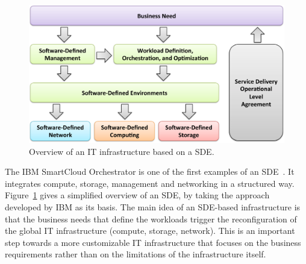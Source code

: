 %
%

\begin{figure}[ht!]
\centering
\includegraphics[width=0.95\columnwidth]{figures/fig10_sde_enabled_IT.pdf}
\caption{Overview of an IT infrastructure based on a SDE.}
\label{fig:SDEenabledIT}
\end{figure}


The IBM SmartCloud Orchestrator is one of the first examples of an SDE~\cite{li2014,racherla2014}.
It integrates compute, storage, management and networking in a structured way.
Figure~\ref{fig:SDEenabledIT} gives a simplified overview of an SDE, by taking the approach developed by IBM as its basis.
The main idea of an SDE-based infrastructure is that the business needs that define the workloads trigger the reconfiguration of the global IT infrastructure (compute, storage, network). 
This is an important step towards a more customizable IT infrastructure that focuses on the business requirements rather than on the limitations of the infrastructure itself.




